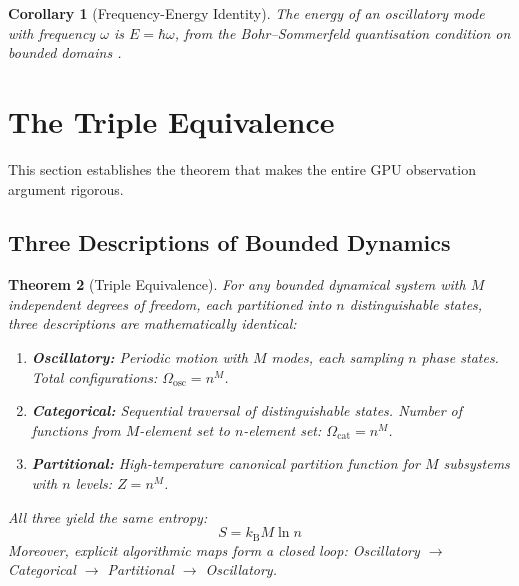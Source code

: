 \documentclass[11pt,twocolumn,a4paper]{article}
\newtheorem{theorem}{Theorem}[section]
\newtheorem{corollary}[theorem]{Corollary}
\theoremstyle{definition}
\theoremstyle{remark}
\newcommand{\kB}{k_{\mathrm{B}}}
\begin{document}
\begin{corollary}[Frequency-Energy Identity]
\label{cor:freq_energy}
The energy of an oscillatory mode with frequency $\omega$ is $E = \hbar\omega$, from the Bohr--Sommerfeld quantisation condition on bounded domains \citep{bohr1913, planck1901}.
\end{corollary}

\section{The Triple Equivalence}
\label{sec:triple}

This section establishes the theorem that makes the entire GPU observation argument rigorous.

\subsection{Three Descriptions of Bounded Dynamics}

\begin{theorem}[Triple Equivalence]
\label{thm:triple}
For any bounded dynamical system with $M$ independent degrees of freedom, each partitioned into $n$ distinguishable states, three descriptions are mathematically identical:
\begin{enumerate}[nosep]
\item \textbf{Oscillatory:} Periodic motion with $M$ modes, each sampling $n$ phase states. Total configurations: $\Omega_{\mathrm{osc}} = n^M$.
\item \textbf{Categorical:} Sequential traversal of distinguishable states. Number of functions from $M$-element set to $n$-element set: $\Omega_{\mathrm{cat}} = n^M$.
\item \textbf{Partitional:} High-temperature canonical partition function for $M$ subsystems with $n$ levels: $Z = n^M$.
\end{enumerate}
All three yield the same entropy:
\begin{equation}
S = \kB M \ln n
\label{eq:triple_entropy}
\end{equation}
Moreover, explicit algorithmic maps form a closed loop: Oscillatory $\to$ Categorical $\to$ Partitional $\to$ Oscillatory.
\end{theorem}
\end{document}
